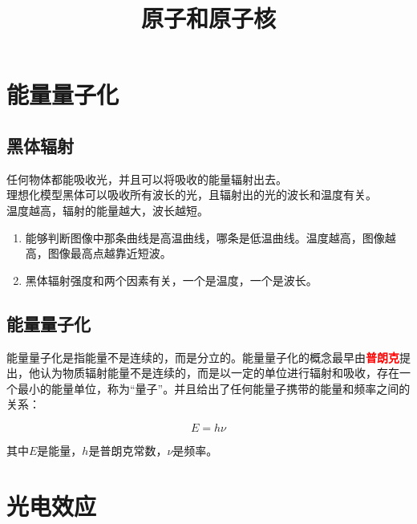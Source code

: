 \documentclass[12pt,a4paper]{article}
\title{原子和原子核}
\begin{document}
\section{能量量子化}
\subsection{黑体辐射}
\indent 任何物体都能吸收光，并且可以将吸收的能量辐射出去。\\
理想化模型黑体可以吸收所有波长的光，且辐射出的光的波长和温度有关。\\
温度越高，辐射的能量越大，波长越短。

\begin{tcolorbox}[colback=yellow!20, colframe=red!75!black, title=考试重点]
    \begin{enumerate}
        \item 能够判断图像中那条曲线是高温曲线，哪条是低温曲线。温度越高，图像越高，图像最高点越靠近短波。
        \item 黑体辐射强度和两个因素有关，一个是温度，一个是波长。
    \end{enumerate}
\end{tcolorbox}

\subsection{能量量子化}

\indent 能量量子化是指能量不是连续的，而是分立的。能量量子化的概念最早由\textbf{\textcolor{red}{普朗克}}提出，他认为物质辐射能量不是连续的，而是以一定的单位进行辐射和吸收，存在一个最小的能量单位，称为“量子”。并且给出了任何能量子携带的能量和频率之间的关系：
\begin{tcolorbox}[colback=green!10, colframe=green!75!black, sharp corners]
    \begin{equation*}
        E = h \nu
    \end{equation*}
\end{tcolorbox}
其中$E$是能量，$h$是普朗克常数，$\nu$是频率。

\section{光电效应}
\end{document}
